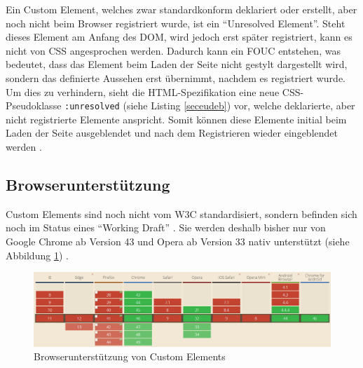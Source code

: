 Ein Custom Element, welches zwar standardkonform deklariert oder erstellt, aber noch nicht beim Browser registriert wurde, ist ein ``Unresolved Element''. Steht dieses Element am Anfang des \ac{DOM}, wird jedoch erst später registriert, kann es nicht von \ac{CSS} angesprochen werden. Dadurch kann ein \ac{FOUC} entstehen, was bedeutet, dass das Element beim Laden der Seite nicht gestylt dargestellt wird, sondern das definierte Aussehen erst übernimmt, nachdem es registriert wurde. Um dies zu verhindern, sieht die \ac{HTML}-Spezifikation eine neue \ac{CSS}-Pseudoklasse \texttt{:unresolved} (siehe Listing \ref{seceudeb}) vor, welche deklarierte, aber nicht registrierte Elemente anspricht. Somit können diese Elemente initial beim Laden der Seite ausgeblendet und nach dem Registrieren wieder eingeblendet werden \cite{citeulike:13844984}.



\subsection{Browserunterstützung}\label{custom-elements-browserunterstuetzung}

Custom Elements sind noch nicht vom \ac{W3C} standardisiert, sondern befinden sich noch im Status eines ``Working Draft'' \cite{citeulike:13845061}. Sie werden deshalb bisher nur von \mbox{Google} Chrome ab Version 43 und Opera ab Version 33 nativ unterstützt (siehe Abbildung \ref{fig:buce}) \cite{citeulike:13844983}.

\begin{figure}[htbp]
 \centering
 \includegraphics[width=\linewidth]{kapitel2/bilder/2-custom-elements-browserunterstuetzung}
 \caption{Browserunterstützung von Custom Elements}
 \label{fig:buce}
\end{figure}
